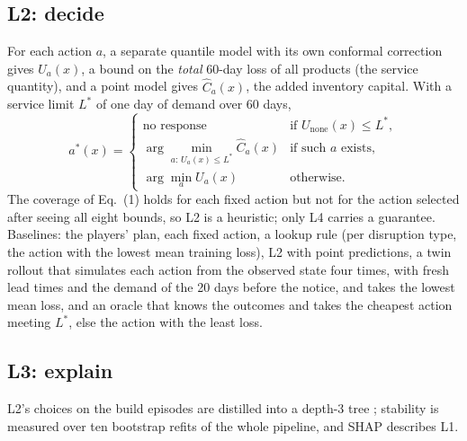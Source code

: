 \documentclass{ifacconf}
\begin{document}
\subsection{L2: decide}
For each action $a$, a separate quantile model with its own conformal correction gives $U_a(x)$, a bound on the
\emph{total} 60-day loss of all products (the service quantity), and a point model gives $\hat C_a(x)$, the added
inventory capital. With a service limit $L^*$ of one day of demand over 60 days,
\begin{equation}
a^*(x)=\begin{cases}
\text{no response} & \text{if } U_{\text{none}}(x)\le L^*,\\
\arg\min_{a:\,U_a(x)\le L^*} \hat C_a(x) & \text{if such } a \text{ exists},\\
\arg\min_a U_a(x) & \text{otherwise.}
\end{cases}
\end{equation}
The coverage of Eq.~(1) holds for each fixed action but not for the action selected after seeing all eight
bounds, so L2 is a heuristic; only L4 carries a guarantee. Baselines: the players' plan, each fixed action, a
lookup rule (per disruption type, the action with the lowest mean training loss), L2 with point predictions, a
twin rollout that simulates each action from the observed state four times, with fresh lead times and the demand
of the 20 days before the notice, and takes the lowest mean loss, and an oracle that knows the outcomes and takes the cheapest action meeting $L^*$, else the
action with the least loss.

\subsection{L3: explain}\label{sec:explain}
L2's choices on the build episodes are distilled into a depth-3 tree \citep{bastani2017extraction}; stability is
measured over ten bootstrap refits of the whole pipeline, and SHAP \citep{lundberg2017shap} describes L1.
\end{document}
